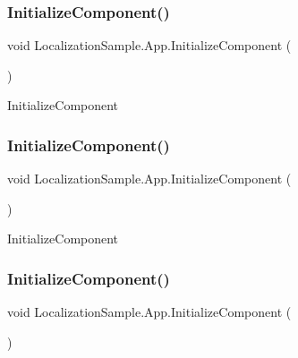 \subsubsection{\texorpdfstring{Initialize\+Component()}{InitializeComponent()}\hspace{0.1cm}{\footnotesize\ttfamily [1/4]}}
{\footnotesize\ttfamily void Localization\+Sample.\+App.\+Initialize\+Component (\begin{DoxyParamCaption}{ }\end{DoxyParamCaption})}



Initialize\+Component 

\mbox{\label{class_localization_sample_1_1_app_aa84c55a5df75b63835973786cf677726}} 
\subsubsection{\texorpdfstring{Initialize\+Component()}{InitializeComponent()}\hspace{0.1cm}{\footnotesize\ttfamily [2/4]}}
{\footnotesize\ttfamily void Localization\+Sample.\+App.\+Initialize\+Component (\begin{DoxyParamCaption}{ }\end{DoxyParamCaption})}



Initialize\+Component 

\mbox{\label{class_localization_sample_1_1_app_aa84c55a5df75b63835973786cf677726}} 
\subsubsection{\texorpdfstring{Initialize\+Component()}{InitializeComponent()}\hspace{0.1cm}{\footnotesize\ttfamily [3/4]}}
{\footnotesize\ttfamily void Localization\+Sample.\+App.\+Initialize\+Component (\begin{DoxyParamCaption}{ }\end{DoxyParamCaption})}




